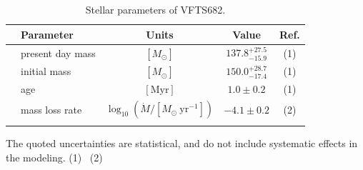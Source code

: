 \documentclass[a4paper,fleqn,usenatbib]{mnras}
\begin{document}
\begin{table}
  \begin{center}
    \caption{Stellar parameters of VFTS682.}
    \vspace*{-15pt}
    \begin{tabular}{llc|c|c}
      \hline\hline
      &Parameter & Units & Value & Ref.\\     
       \hline
     & present day mass  & $[M_\odot]$ & $137.8^{+27.5}_
                                           {-15.9}$ & (1)
                                                    \\
      & initial mass& $[M_\odot]$ & $150.0^{+28.7}_{-17.4}$ & (1)
      \\
      &age & $[\mathrm{Myr}]$ & $1.0\pm0.2$ & (1) \\
      & mass loss rate & $\log_{10}(\dot{M}/[M_\odot \ \mathrm{yr}^{-1}])$ & $-4.1\pm0.2$ & (2)\\
      \hline
      \label{tab:star_param}
    \end{tabular}
    \vspace*{-5pt}
    {\tiny The quoted uncertainties are statistical, and do not include systematic
      effects in the modeling.
      (1)~\cite{schneider:18}
      (2)~\cite{bestenlehner:11}}
  \end{center}
\end{table}
\end{document}
